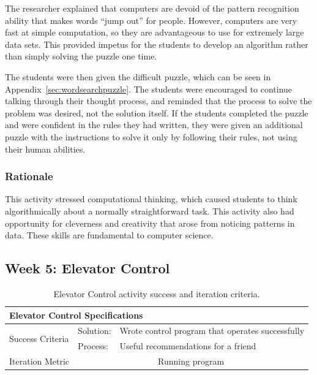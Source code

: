 	The researcher explained that computers are devoid of the pattern
	recognition ability that makes words {}``jump out'' for people.
	However, computers are very fast at simple computation, so they are
	advantageous to use for extremely large data sets. This provided
	impetus for the students to develop an algorithm rather than simply
	solving the puzzle one time.
	
	The students were then given the difficult puzzle, which can be
	seen in Appendix~\ref{sec:wordsearchpuzzle}. The students were encouraged
	to continue talking through their thought process, and reminded that
	the process to solve the problem was desired, not the solution itself.
	If the students completed the puzzle and were confident in the rules
	they had written, they were given an additional puzzle with the
	instructions to solve it only by following their rules, not using
	their human abilities.
	
	
	\subsubsection{Rationale}
	
	This activity stressed computational thinking, which caused students to think algorithmically about a normally straightforward task. This activity also had opportunity for cleverness and creativity that arose from noticing patterns in data. These skills are fundamental to computer science. 

\subsection{Week 5: Elevator Control}

	\begin{table}
	\begin{centering}
	\begin{tabular}{l  l   l}
		\multicolumn{3}{l}{{\large Elevator Control Specifications}} \\
		\toprule
		\multirow{2}{*}{Success Criteria}  
			& Solution: 		& Wrote control program that operates successfully \\ \cmidrule(r){2-3}
			& Process:		& Useful recommendations for a friend \\ \midrule
		Iteration Metric	 & \multicolumn{2}{c}{Running program }\\ 
		\bottomrule
	\end{tabular}
	\caption{Elevator Control activity success and iteration criteria.}
	\label{tab:spec-elevator}
	\end{centering}
	\end{table}
	
